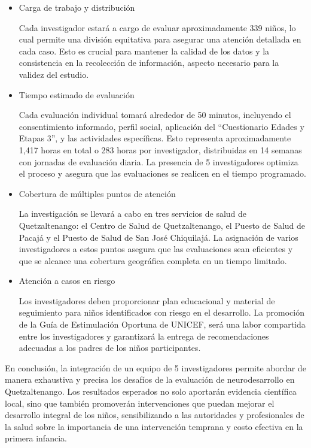 \documentclass[11pt,letterpaper]{report}
\newcommand{\asq}{“Cuestionario Edades y Etapas 3”}
\begin{document}
\begin{itemize}
    \item Carga de trabajo y distribución

Cada investigador estará a cargo de evaluar aproximadamente 339 niños, lo cual
permite una división equitativa para asegurar una atención detallada en cada
caso. Esto es crucial para mantener la calidad de los datos y la consistencia
en la recolección de información, aspecto necesario para la validez del
estudio.

	\item Tiempo estimado de evaluación

Cada evaluación individual tomará alrededor de 50 minutos, incluyendo el
consentimiento informado, perfil social, aplicación del \asq, y las actividades
específicas. Esto representa aproximadamente 1,417 horas en total o 283 horas
por investigador, distribuidas en 14 semanas con jornadas de evaluación diaria.
La presencia de 5 investigadores optimiza el proceso y asegura que las
evaluaciones se realicen en el tiempo programado.
	
	\item Cobertura de múltiples puntos de atención

La investigación se llevará a cabo en tres servicios de salud de Quetzaltenango:
el Centro de Salud de Quetzaltenango, el Puesto de Salud de Pacajá y el Puesto
de Salud de San José Chiquilajá. La asignación de varios investigadores a estos
puntos asegura que las evaluaciones sean eficientes y que se alcance una
cobertura geográfica completa en un tiempo limitado.

	\item Atención a casos en riesgo

Los investigadores deben proporcionar plan educacional y material de
seguimiento para niños identificados con riesgo en el desarrollo. La promoción
de la Guía de Estimulación Oportuna de UNICEF, será una labor compartida entre
los investigadores y garantizará la entrega de recomendaciones adecuadas a los
padres de los niños participantes.

\end{itemize}

En conclusión, la integración de un equipo de 5 investigadores permite abordar
de manera exhaustiva y precisa los desafíos de la evaluación de neurodesarrollo
en Quetzaltenango. Los resultados esperados no solo aportarán evidencia
científica local, sino que también promoverán intervenciones que puedan mejorar
el desarrollo integral de los niños, sensibilizando a las autoridades y
profesionales de la salud sobre la importancia de una intervención temprana y
costo efectiva en la primera infancia.
\end{document}
